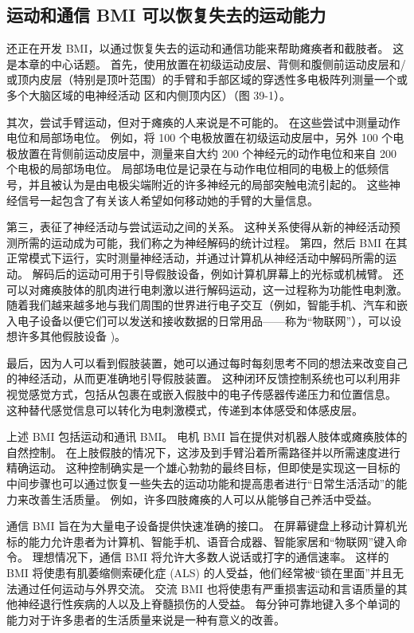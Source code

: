 \subsection{运动和通信 BMI 可以恢复失去的运动能力}

还正在开发 BMI，以通过恢复失去的运动和通信功能来帮助瘫痪者和截肢者。 这是本章的中心话题。 首先，使用放置在初级运动皮层、背侧和腹侧前运动皮层和/或顶内皮层（特别是顶叶范围）的手臂和手部区域的穿透性多电极阵列测量一个或多个大脑区域的电神经活动 区和内侧顶内区）（图 39-1）。

其次，尝试手臂运动，但对于瘫痪的人来说是不可能的。 在这些尝试中测量动作电位和局部场电位。 例如，将 100 个电极放置在初级运动皮层中，另外 100 个电极放置在背侧前运动皮层中，测量来自大约 200 个神经元的动作电位和来自 200 个电极的局部场电位。 局部场电位是记录在与动作电位相同的电极上的低频信号，并且被认为是由电极尖端附近的许多神经元的局部突触电流引起的。 这些神经信号一起包含了有关该人希望如何移动她的手臂的大量信息。

第三，表征了神经活动与尝试运动之间的关系。 这种关系使得从新的神经活动预测所需的运动成为可能，我们称之为神经解码的统计过程。 第四，然后 BMI 在其正常模式下运行，实时测量神经活动，并通过计算机从神经活动中解码所需的运动。 解码后的运动可用于引导假肢设备，例如计算机屏幕上的光标或机械臂。 还可以对瘫痪肢体的肌肉进行电刺激以进行解码运动，这一过程称为功能性电刺激。 随着我们越来越多地与我们周围的世界进行电子交互（例如，智能手机、汽车和嵌入电子设备以便它们可以发送和接收数据的日常用品——称为“物联网”），可以设想许多其他假肢设备 )。

最后，因为人可以看到假肢装置，她可以通过每时每刻思考不同的想法来改变自己的神经活动，从而更准确地引导假肢装置。 这种闭环反馈控制系统也可以利用非视觉感觉方式，包括从包裹在或嵌入假肢中的电子传感器传递压力和位置信息。 这种替代感觉信息可以转化为电刺激模式，传递到本体感受和体感皮层。

上述 BMI 包括运动和通讯 BMI。 电机 BMI 旨在提供对机器人肢体或瘫痪肢体的自然控制。 在上肢假肢的情况下，这涉及到手臂沿着所需路径并以所需速度进行精确运动。 这种控制确实是一个雄心勃勃的最终目标，但即使是实现这一目标的中间步骤也可以通过恢复一些失去的运动功能和提高患者进行“日常生活活动”的能力来改善生活质量。 例如，许多四肢瘫痪的人可以从能够自己养活中受益。

通信 BMI 旨在为大量电子设备提供快速准确的接口。 在屏幕键盘上移动计算机光标的能力允许患者为计算机、智能手机、语音合成器、智能家居和“物联网”键入命令。 理想情况下，通信 BMI 将允许大多数人说话或打字的通信速率。 这样的 BMI 将使患有肌萎缩侧索硬化症 (ALS) 的人受益，他们经常被“锁在里面”并且无法通过任何运动与外界交流。 交流 BMI 也将使患有严重损害运动和言语质量的其他神经退行性疾病的人以及上脊髓损伤的人受益。 每分钟可靠地键入多个单词的能力对于许多患者的生活质量来说是一种有意义的改善。

